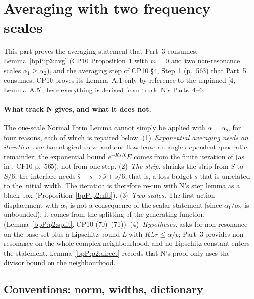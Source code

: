 \section{Averaging with two frequency scales}\label{bpP:p2}
\providecommand{\wn}[3]{\lvert #1\rvert_{#2,#3}}
\providecommand{\Dom}[2]{\mathcal D_{#1,#2}}
\providecommand{\Os}[2]{\mathcal O(#1,#2)}
\begingroup\sloppy

This part proves the averaging statement that Part~3 consumes, Lemma~\ref{bpP:p3:avg} (CP10 Proposition~1 with $m=0$ and two non-resonance scales
$\alpha_1\ge\alpha_2$), and the averaging step of CP10 \S4, Step~1 (p.~563) that Part~5 consumes. CP10 proves its Lemma~A.1 only by reference to
the unpinned [4, Lemma~A.5]; here everything is derived from track~N's Parts~4--6.

\paragraph{What track N gives, and what it does not.} The one-scale Normal Form Lemma  cannot simply be applied with $\alpha=\alpha_2$,
for four reasons, each of which is repaired below.
(1)~\emph{Exponential averaging needs an iteration}: one homological solve and one flow leave an angle-dependent quadratic remainder; the exponential bound
$e^{-Ks/6}E$ comes from the finite iteration of  (as in , CP10 p.~565), not from one step.
(2)~\emph{The strip.}  shrinks the strip from $S$ to $S/6$; the interface needs $\bar s+s\to\bar s+s/6$, that is, a loss budget $s$ that is
unrelated to the initial width. The iteration is therefore re-run with N's step lemma as a black box (Proposition~\ref{bpP:p2:nfb}).
(3)~\emph{Two scales.} The first-action displacement with $\alpha_1$ is not a consequence of the scalar statement (since $\alpha_1/\alpha_2$ is unbounded);
it comes from the splitting of the generating function (Lemma~\ref{bpP:p2:split}, CP10 (70)--(71)).
(4)~\emph{Hypotheses.}  asks for non-resonance on the base set plus a Lipschitz bound $L$ with $KLr\le\alpha/p$; Part~3 provides non-resonance on the whole
complex neighbourhood, and no Lipschitz constant enters the statement. Lemma~\ref{bpP:p2:direct} records that N's proof only uses the divisor bound on the neighbourhood.

\subsection{Conventions: norm, widths, dictionary}\label{bpP:p2:conv}

